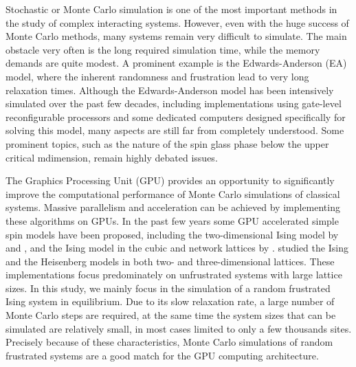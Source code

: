 Stochastic or Monte Carlo  simulation is one of the most important methods in 
the study of complex interacting systems. However, even with the huge success 
of Monte Carlo methods, many systems remain very difficult to simulate. 
The main obstacle very often is the long required simulation time, while 
the memory demands are quite modest. A prominent example is the Edwards-Anderson (EA) 
model, where the inherent randomness and frustration lead to very long relaxation 
times. Although the Edwards-Anderson model has been intensively simulated over the 
past few decades, including implementations using gate-level reconfigurable processors 
\cite{Monaghan-1993} and some dedicated computers designed specifically for solving this model, 
\cite{Ogielski-Morgenstern-1985,Ogielski-1985,Cruz-2001,Condon-Ogielski-1985,Taiji-Ito-Suzuki-1988} 
many aspects are still far from completely understood. Some prominent 
topics, such as the nature of the spin glass phase below the upper critical 
mdimension, remain highly debated issues.~\cite{Jorg-Katzgraber-Krzakala-2008,
Moore-2005,Young-Katzgraber2004,Temesvari-2008,Katzgraber-2008,Sasaki-etal-2008,
Sasaki-etal-2007,Larson-etal-2013,Banos-2012,Katzgraber-2012,Katzgraber-Larson-Young-2009,
Leuzzi-2009}

The Graphics Processing Unit (GPU) provides an opportunity to 
significantly improve the computational performance of Monte Carlo simulations 
of classical systems. Massive parallelism and acceleration can be achieved by 
implementing these algorithms on GPUs. In the past few years some GPU accelerated 
simple spin models have been proposed, including the two-dimensional Ising model 
by \citet{CSTN-093} and \citet{2010CoPhC.181.1549B}, and the Ising model in the cubic 
and network lattices by \citet{Preis:2009:GAM:1537305.1537344}.
\citet{doi:10.1142/S0129183112400025,Weigel:2012:PPS:2151219.2151631}
studied the Ising and the Heisenberg models 
in both two- and three-dimensional lattices. These implementations focus 
predominately on unfrustrated systems with large lattice sizes. In this study, we mainly 
focus in the simulation of a random frustrated Ising system in equilibrium. 
Due to its slow relaxation rate, a large number of Monte Carlo 
steps are required, at the same time the system sizes that can be simulated are 
relatively small, in most cases limited to only a few thousands sites. Precisely 
because of these characteristics, Monte Carlo simulations of random frustrated 
systems are a good match for the GPU computing architecture.

